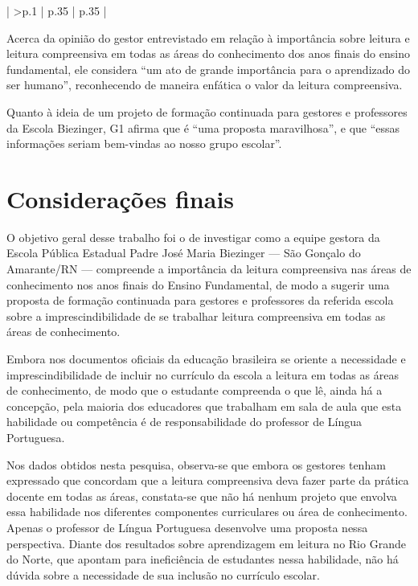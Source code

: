 \begin{refsection}
\begin{small}
\begin{longquadro}[t]{ | 
            >{\centering\arraybackslash}p{.1\textwidth} |
            p{.35\textwidth} |
            p{.35\textwidth} |
        }
        \end{longquadro}
    \end{small}

    Acerca da opinião do gestor entrevistado em relação à importância sobre leitura e leitura compreensiva em todas as áreas do conhecimento dos anos finais do ensino fundamental, ele considera “um ato de grande importância para o aprendizado do ser humano”, reconhecendo de maneira enfática o valor da leitura compreensiva. 

    Quanto à ideia de um projeto de formação continuada para gestores e professores da Escola Biezinger, G1 afirma que é “uma proposta maravilhosa”, e que “essas informações seriam bem-vindas ao nosso grupo escolar”.

    \section{Considerações finais}

    O objetivo geral desse trabalho foi o de investigar como a equipe gestora da Escola Pública Estadual Padre José Maria Biezinger --- São Gonçalo do Amarante/RN --- compreende a importância da leitura compreensiva nas áreas de conhecimento nos anos finais do Ensino Fundamental, de modo a sugerir uma proposta de formação continuada para gestores e professores da referida escola sobre a imprescindibilidade de se trabalhar leitura compreensiva em todas as áreas de conhecimento.  

    Embora nos documentos oficiais da educação brasileira se oriente a necessidade e imprescindibilidade de incluir no currículo da escola a leitura em todas as áreas de conhecimento, de modo que o estudante compreenda o que lê, ainda há a concepção, pela maioria dos educadores que trabalham em sala de aula que esta habilidade ou competência é de responsabilidade do professor de Língua Portuguesa. 

    Nos dados obtidos nesta pesquisa, observa-se que embora os gestores tenham expressado que concordam que a leitura compreensiva deva fazer parte da prática docente em todas as áreas, constata-se que não há nenhum projeto que envolva essa habilidade nos diferentes componentes curriculares ou área de conhecimento. Apenas o professor de Língua Portuguesa desenvolve uma proposta nessa perspectiva. Diante dos resultados sobre aprendizagem em leitura no Rio Grande do Norte, que apontam para ineficiência de estudantes nessa habilidade, não há dúvida sobre a necessidade de sua inclusão no currículo escolar. 


\end{refsection}
